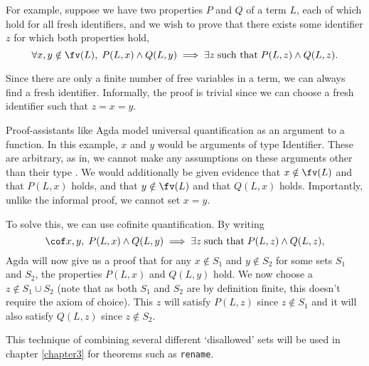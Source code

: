 For example, suppose we have two properties $P$ and $Q$ of a term $L$, each of which hold for all
fresh identifiers, and we wish to prove that there exists some identifier $z$ for which both
properties hold,
\begin{equation*}
  \forall x, y \notin \fv(L), \; P(L, x) \wedge Q(L, y)
    \implies \exists z \; \text{such that} \; P(L, z) \wedge Q(L, z).
\end{equation*}

Since there are only a finite number of free variables in a term, we can always find a fresh
identifier. Informally, the proof is trivial since we can choose a fresh identifier such that $z = x
= y$.

Proof-assistants like Agda model universal quantification as an argument to a function. In this
example, $x$ and $y$ would be arguments of type Identifier. These are arbitrary, as in, we cannot
make any assumptions on these arguments other than their type
\citep[chapter~Quantifier]{wadler_programming_2022}. We would additionally be given evidence that $x
\notin \fv(L)$ and that $P(L, x)$ holds, and that $y \notin \fv(L)$ and that $Q(L, x)$ holds.
Importantly, unlike the informal proof, we cannot set $x = y$.

To solve this, we can use cofinite quantification. By writing
\begin{equation*}
  \cof x, y, \; P(L, x) \wedge Q(L, y)
  \implies \exists z \; \text{such that} \; P(L, z) \wedge Q(L, z),
\end{equation*}
Agda will now give us a proof that for any $x \notin S_1$ and $y \notin S_2$ for some sets $S_1$ and
$S_2$, the properties $P(L, x)$ and $Q(L, y)$ hold. We now choose a $z \notin S_1 \cup
S_2$ (note that as both $S_1$ and $S_2$ are by definition finite, this doesn't require the
axiom of choice). This $z$ will satisfy $P(L, z)$ since $z \notin S_1$ and it will also satisfy
$Q(L, z)$ since $z \notin S_2$.

This technique of combining several different `disallowed' sets will be used in chapter
\ref{chapter3} for theorems such as \texttt{rename}.